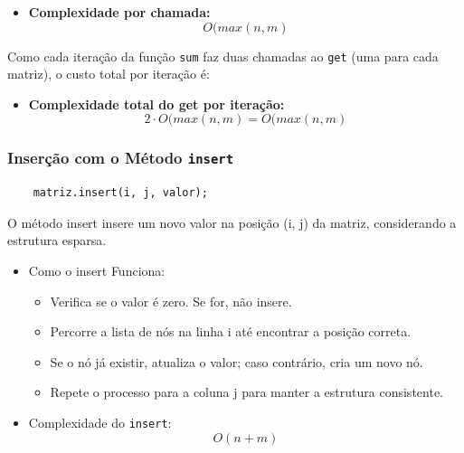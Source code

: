 \documentclass[12pt]{article}
\begin{document}
    \begin{itemize}
        \item \textbf{Complexidade por chamada:} 
        \begin{equation}
            O(max(n, m)
        \end{equation}
    \end{itemize}

Como cada iteração da função \texttt{sum} faz duas chamadas ao \texttt{get} (uma para cada matriz), o custo total por iteração é:

\begin{itemize}
    \item \textbf{Complexidade total do get por iteração:} 
        \begin{equation}
            2 \cdot O(max(n, m) = O(max(n, m)
        \end{equation}
\end{itemize}

\subsubsection{Inserção com o Método \texttt{insert}}

\begin{lstlisting}
    matriz.insert(i, j, valor);
\end{lstlisting}

O método insert insere um novo valor na posição (i, j) da matriz, considerando a estrutura esparsa.

\begin{itemize}
    \item Como o insert Funciona:
        \begin{itemize}
            \item Verifica se o valor é zero. Se for, não insere.
            \item Percorre a lista de nós na linha i até encontrar a posição correta.
            \item Se o nó já existir, atualiza o valor; caso contrário, cria um novo nó.
            \item Repete o processo para a coluna j para manter a estrutura consistente.
        \end{itemize}

    \item Complexidade do \texttt{insert}: 
        \begin{equation}
            O(n + m)
        \end{equation}
\end{itemize}
\end{document}
